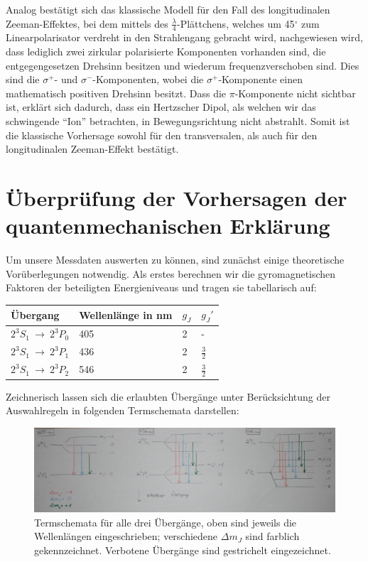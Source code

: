 \documentclass[bigchapter,colorback,accentcolor=tud4b,linedtoc,11pt]{tudreport}
\begin{document}
Analog bestätigt sich das klassische Modell für den Fall des longitudinalen Zeeman-Effektes, bei dem mittels des $\frac{\lambda}{4}$-Plättchens, welches um 45$^{\circ}$ zum Linearpolarisator verdreht in den Strahlengang gebracht wird, nachgewiesen wird, dass lediglich zwei zirkular polarisierte Komponenten vorhanden sind, die entgegengesetzen Drehsinn besitzen und wiederum frequenzverschoben sind. Dies sind die $\sigma^+$- und $\sigma^-$-Komponenten, wobei die $\sigma^+$-Komponente einen mathematisch positiven Drehsinn besitzt. Dass die $\pi$-Komponente nicht sichtbar ist, erklärt sich dadurch, dass ein Hertzscher Dipol, als welchen wir das schwingende "`Ion"' betrachten, in Bewegungsrichtung nicht abstrahlt. Somit ist die klassische Vorhersage sowohl für den transversalen, als auch für den longitudinalen Zeeman-Effekt bestätigt.

\section{Überprüfung der Vorhersagen der quantenmechanischen Erklärung}

Um unsere Messdaten auswerten zu können, sind zunächst einige theoretische Vorüberlegungen notwendig. Als erstes berechnen wir die gyromagnetischen Faktoren der beteiligten Energieniveaus und tragen sie tabellarisch auf: 

\begin{center}
  \begin{tabular}{|p{2.2cm}|p{4cm}|p{2cm}|p{2cm}|}
    \hline
    Übergang & Wellenlänge in nm & $g_J$ & $g_J'$  \\ \hline
    $2^3S_1~\rightarrow~2^3P_0$ & 405 & 2 & - \\ \hline
    $2^3S_1~\rightarrow~2^3P_1$ & 436 & 2 & $\frac{3}{2}$ \\ \hline
    $2^3S_1~\rightarrow~2^3P_2$ & 546 & 2 & $\frac{3}{2}$ \\ \hline
	\end{tabular}
\end{center}

Zeichnerisch lassen sich die erlaubten Übergänge unter Berücksichtung der Auswahlregeln in folgenden Termschemata darstellen:

\begin{figure}[H] 
  \centering
     \includegraphics[width=1\textwidth]{data/Termschemata.JPG}
  \caption{Termschemata für alle drei Übergänge, oben sind jeweils die Wellenlängen eingeschrieben; verschiedene $\Delta m_J$ sind farblich gekennzeichnet. Verbotene Übergänge sind gestrichelt eingezeichnet.}
  \label{fig:Bild1}
\end{figure}
\end{document}
